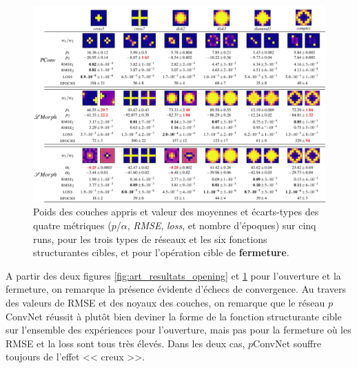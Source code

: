 \vspace{-4mm}
\begin{figure}[ht]
  \begin{center}
    \includegraphics[width=1.00\textwidth]{parts/2-etat_de_lart/D-efficacite_des_reseaux_existant/figures/art_closing.png}
    \vspace{-4.0mm}
    \caption{ \centering Poids des couches appris et valeur des moyennes et écarts-types des quatre métriques ($p$/$\alpha$, \textit{RMSE}, \textit{loss}, et nombre d'époques) sur cinq runs, pour les trois types de réseaux et les six fonctions structurantes cibles, et pour l'opération cible de \textbf{fermeture}.}
    \label{fig:art_resultats_closing}
  \end{center}
\end{figure}


\vspace{-4.2mm}
A partir des deux figures \ref{fig:art_resultats_opening} et  \ref{fig:art_resultats_closing} pour l'ouverture et la fermeture, on remarque la présence évidente d'échecs de convergence. 
Au travers des valeurs de RMSE et des noyaux des couches, on remarque que le réseau $p$ConvNet réussit à plutôt bien deviner la forme de la fonction structurante cible sur l'ensemble des expériences pour l'ouverture, mais pas pour la fermeture où les RMSE et la loss sont tous très élevés. Dans les deux cas, $p$ConvNet souffre toujours de l'effet << creux >>. \\

